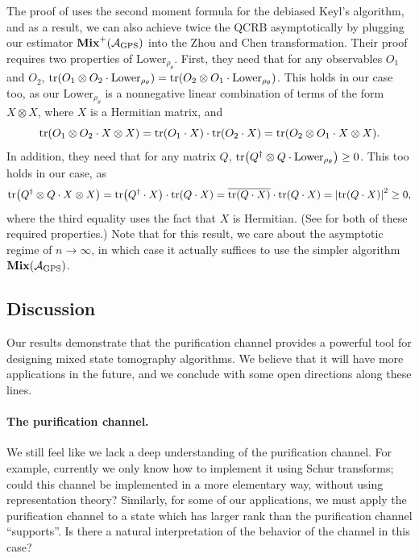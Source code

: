 \documentclass{article}
\newcommand{\mixed}{\textup{\textbf{Mix}}}
\newcommand{\gps}{\calA_{\mathrm{GPS}}}
\begin{document}
 The proof of \cite{PSW25} uses the second moment formula for the debiased Keyl's algorithm,
and as a result, we can also achieve twice the QCRB asymptotically by plugging our estimator $\mixed^+(\gps)$ into the Zhou and Chen transformation.
Their proof requires two properties of $\mathrm{Lower}_{\rho_{\theta}}$.
First, they need that for any observables $O_1$ and $O_2$, $\tr(O_1 \otimes O_2 \cdot \mathrm{Lower}_{\rho_{\theta}}) = \tr(O_2 \otimes O_1 \cdot \mathrm{Lower}_{\rho_{\theta}})$.
This holds in our case too, as our $\mathrm{Lower}_{\rho_{\theta}}$ is a nonnegative linear combination of terms of the form $X \otimes X$, where $X$ is a Hermitian matrix,
and
\begin{equation*}
    \tr(O_1 \otimes O_2  \cdot X \otimes X) = \tr(O_1 \cdot X)\cdot  \tr(O_2  \cdot X)
    = \tr(O_2 \otimes O_1 \cdot X \otimes X).
\end{equation*}
In addition, they need that for any matrix $Q$, $\tr(Q^\dagger \otimes Q \cdot \mathrm{Lower}_{\rho_{\theta}}) \geq 0$. This too holds in our case, as
\begin{equation*}
    \tr(Q^\dagger \otimes Q \cdot X \otimes X)
    = \tr(Q^\dagger \cdot X) \cdot \tr(Q \cdot X)
    = \overline{\tr(Q \cdot X)} \cdot \tr(Q \cdot X)
    = \abs{\tr(Q \cdot X)}^2 \geq 0,
\end{equation*}
where the third equality uses the fact that $X$ is Hermitian.
(See \cite[Proof of Theorem 8.1]{PSW25} for both of these required properties.)
Note that for this result, we care about the asymptotic regime of $n \rightarrow \infty$, in which case it actually suffices to use the  simpler algorithm $\mixed(\gps)$.

\subsection{Discussion} \label{subsec:discussion}

Our results demonstrate that the purification channel provides a powerful tool for designing mixed state tomography algorithms.
We believe that it will have more applications in the future, and we conclude with some open directions along these lines.

\paragraph{The purification channel.}
We still feel like we lack a deep understanding of the purification channel.
For example, currently we only know how to implement it using Schur transforms; could this channel be implemented in a more elementary way, without using representation theory?
Similarly, for some of our applications, we must apply the purification channel to a state which has larger rank than the purification channel ``supports''.
Is there a natural interpretation of the behavior of the channel in this case?
\end{document}
